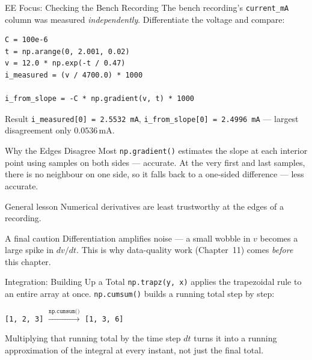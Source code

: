 \documentclass[9pt,aspectratio=169,xcolor=table]{beamer}
\begin{document}
\begin{frame}[fragile]{EE Focus: Checking the Bench Recording}
    \leavevmode
    \small
    The bench recording's \texttt{current\_mA} column was measured
    \emph{independently}. Differentiate the voltage and compare:

\begin{lstlisting}
C = 100e-6
t = np.arange(0, 2.001, 0.02)
v = 12.0 * np.exp(-t / 0.47)
i_measured = (v / 4700.0) * 1000

i_from_slope = -C * np.gradient(v, t) * 1000
\end{lstlisting}

    \begin{alertblock}{Result}
        \texttt{i\_measured[0] = 2.5532 mA}, \texttt{i\_from\_slope[0]
        = 2.4996 mA} --- largest disagreement only $0.0536\,\text{mA}$.
    \end{alertblock}
\end{frame}

\begin{frame}{Why the Edges Disagree Most}
    \leavevmode
    \texttt{np.gradient()} estimates the slope at each interior point
    using samples on \alert{both} sides --- accurate. At the very first
    and last samples, there is no neighbour on one side, so it falls
    back to a one-sided difference --- less accurate.

    \vspace{3mm}
    \begin{block}{General lesson}
        Numerical derivatives are least trustworthy at the
        \alert{edges} of a recording.
    \end{block}

    \vspace{3mm}
    \begin{alertblock}{A final caution}
        Differentiation \alert{amplifies} noise --- a small wobble in
        $v$ becomes a large spike in $dv/dt$. This is why data-quality
        work (Chapter~11) comes \emph{before} this chapter.
    \end{alertblock}
\end{frame}

\begin{frame}{Integration: Building Up a Total}
    \leavevmode
    \small
    \texttt{np.trapz(y, x)} applies the trapezoidal rule to an entire
    array at once. \texttt{np.cumsum()} builds a \alert{running total}
    step by step:

    \vspace{2mm}
    \begin{center}
    \texttt{[1, 2, 3]} $\xrightarrow{\texttt{np.cumsum()}}$ \texttt{[1,
    3, 6]}
    \end{center}

    \vspace{3mm}
    Multiplying that running total by the time step $dt$ turns it into
    a running approximation of the integral at \alert{every instant},
    not just the final total.
\end{frame}
\end{document}

